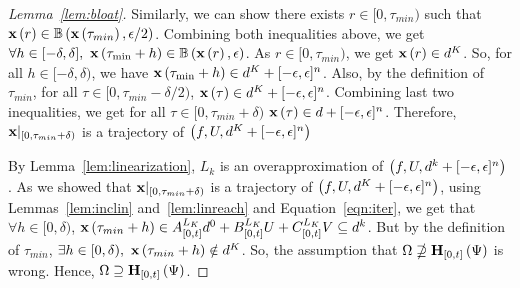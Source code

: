 \begin{appendix}
\begin{proof}[Lemma~\ref{lem:bloat}]
Similarly, we can show there exists $r\in[0,\tau_{min})$ such that
$\mathbf{x}\left(r\right)\in \mathbb{B}\left(\mathbf{x}\left(\tau_{min}\right),\epsilon/2\right)$.  Combining both
inequalities above, we get $\forall
h\in[-\delta,\delta],~\mathbf{x}\left(\tau_{\min}+h\right)\in \mathbb{B}\left(\mathbf{x}\left(r\right),\epsilon\right)$.
As $r\in[0,\tau_{min})$, we get $\mathbf{x}\left(r\right)\in d^K$.  So, for all
$h\in[-\delta,\delta)$, we have $\mathbf{x}\left(\tau_{\min}+h\right)\in d^K +
[-\epsilon,\epsilon]^n$.  Also, by the definition of $\tau_{min}$, for
all $\tau\in[0,\tau_{min}-\delta/2)$, $\mathbf{x}\left(\tau\right)\in d^K +
[-\epsilon,\epsilon]^n$. Combining last two inequalities, we get for
all $\tau\in[0,\tau_{min}+\delta)$ $\mathbf{x}\left(\tau\right)\in d +
[-\epsilon,\epsilon]^n$.  Therefore,
$\mathbf{x}|_{[0,\tau_{min}+\delta)}$ is a trajectory of
$\left(f,U,d^K+[-\epsilon,\epsilon]^n\right)$

By Lemma~\ref{lem:linearization}, $L_k$ is an overapproximation of
$\left(f,U,d^k+[-\epsilon,\epsilon]^n\right)$ .  As we showed that
$\mathbf{x}|_{[0,\tau_{min}+\delta)}$ is a trajectory of
$\left(f,U,d^K+[-\epsilon,\epsilon]^n\right)$, using
Lemmas~\ref{lem:inclin} and~\ref{lem:linreach} and
Equation~\ref{eqn:iter}, we get that $\forall h\in [0,\delta)$,
$\mathbf{x}\left(\tau_{min}+h\right)\in {A}^{L_K}_{[0,t]}d^0
+ {B}^{L_K}_{[0,t]}U
+ {C}^{L_K}_{[0,t]}V \subseteq d^{k}$.  But by the
definition of $\tau_{min}$, $\exists h\in
[0,\delta),~\mathbf{x}\left(\tau_{min}+h\right)\notin d^K$.  So, the assumption
that $\Omega\nsupseteq \mathbf{H}_{[0,t]}\left(\Psi\right)$ is wrong.  Hence,
$\Omega\supseteq \mathbf{H}_{[0,t]}\left(\Psi\right)$.
\end{proof}
%
\end{appendix}


